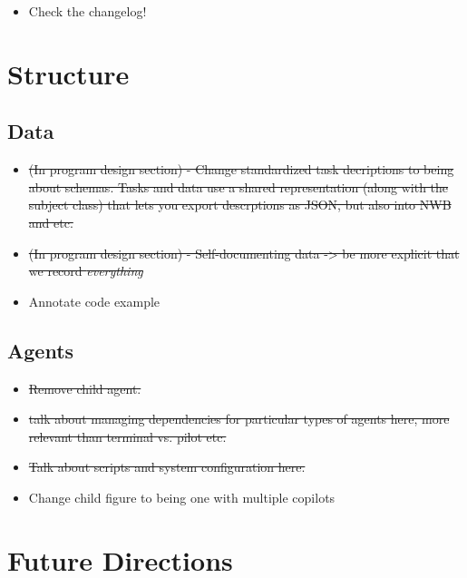 \begin{itemize}
\item Check the changelog!
\end{itemize}

\section{Structure}


\subsection{Data}

\begin{itemize}
\item \sout{(In program design section) - Change standardized task decriptions to being about schemas. Tasks and data use a shared representation (along with the subject class) that lets you export descrptions as JSON, but also into NWB and etc.}
\item \sout{(In program design section) - Self-documenting data -> be more explicit that we record \textit{everything}}
\item Annotate code example
\end{itemize}


\subsection{Agents}

\begin{itemize}
\item \sout{Remove child agent.}
\item \sout{talk about managing dependencies for particular types of agents here, more relevant than terminal vs. pilot etc.}
\item \sout{Talk about scripts and system configuration here.}
\item Change child figure to being one with multiple copilots
\end{itemize}



\section{Future Directions}


